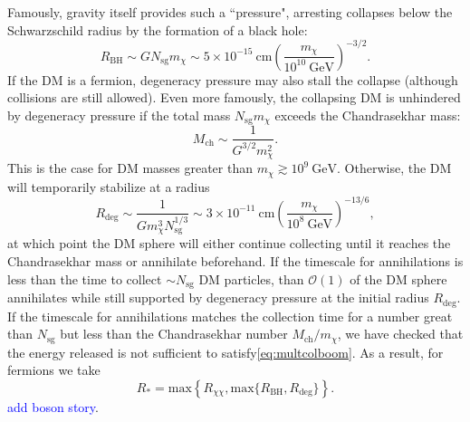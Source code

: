 \documentclass[preprintnumbers,amsmath,amssymb,prd,superscriptaddress]{revtex4}
\newcommand{\Eboom}{\mathcal{E}_\text{boom}}
\newcommand{\OO}{\mathcal{O}}
\newcommand{\GeV}{\text{GeV}}
\newcommand{\cm}{\text{cm}}
\def\r{\right)}
\def\l{\left(}
\begin{document}
Famously, gravity itself provides such a ``pressure", arresting collapses below the Schwarzschild radius by the formation of a black hole:
\begin{equation}
R_\text{BH} \sim G N_\text{sg} m_\chi \sim 5 \times 10^{-15} ~\cm \l \frac{m_\chi}{10^{10} ~\GeV} \r^{-3/2}.
\end{equation}
If the DM is a fermion, degeneracy pressure may also stall the collapse (although collisions are still allowed). 
Even more famously, the collapsing DM is unhindered by degeneracy pressure if the total mass $N_\text{sg} m_\chi$ exceeds the Chandrasekhar mass:
\begin{equation}
M_\text{ch} \sim \frac{1}{G^{3/2} m_\chi^2}.
\end{equation}
This is the case for DM masses greater than $m_\chi \gtrsim 10^{9} ~\GeV$.
Otherwise, the DM will temporarily stabilize at a radius
\begin{equation}
R_\text{deg} \sim \frac{1}{G m_\chi^3 N_\text{sg}^{1/3}} \sim 3 \times 10^{-11} ~\cm \l\frac{m_\chi}{10^{8} ~\GeV}\r^{-13/6},
\end{equation}
at which point the DM sphere will either continue collecting until it reaches the Chandrasekhar mass or annihilate beforehand. 
If the timescale for annihilations is less than the time to collect $\sim N_\text{sg}$ DM particles, than $\OO(1)$ of the DM sphere annihilates while still supported by degeneracy pressure at the initial radius $R_\text{deg}$. 
If the timescale for annihilations matches the collection time for a number great than $N_\text{sg}$ but less than the Chandrasekhar number $M_\text{ch}/m_\chi$, we have checked that the energy released is not sufficient to satisfy\eqref{eq:multcolboom}. 
As a result, for fermions we take
\begin{equation}
R_* = \text{max}\left \{R_{\chi \chi}, \text{max}\{R_\text{BH}, R_\text{deg}\} \right \}. 
\end{equation}
\textcolor{blue}{add boson story}. 

\end{document}
